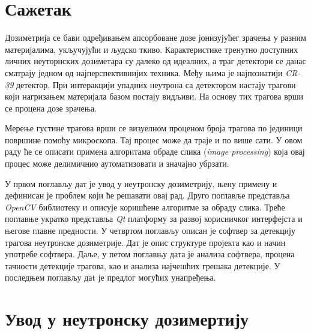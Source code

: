 \documentclass[12pt,a4paper,serbian,oneside]{book}
\begin{document}


%
%
%

\tableofcontents
\newpage

%
%
%

\chapter*{Сажетак}

Дозиметрија се бави одређивањем апсорбоване дозе јонизујућег зрачења у разним материјалима, укључујући и људско ткиво. Карактеристике тренутно доступних личних неуторнских дозиметара су далеко од идеалних, а траг детектори се данас сматрају једном од најперспективнијих техника. Међу њима је најпознатији \textit{CR-39} детектор. При интеракцији упадних неутрона са детектором настају трагови који нагризањем материјала базом постају видљиви. На основу тих трагова врши се процена дозе зрачења. 

Мерење густине трагова врши се визуелном проценом броја трагова по јединици површине помоћу микроскопа. Тај процес може да траје и по више сати. У овом раду ће се описати примена алгоритама обраде слика (\textit{image processing}) која овај процес може делимичнио аутоматизовати и значајно убрзати.

У првом поглављу дат је увод у неутронску дозиметрију, њену примену и дефинисан је проблем који ће решавати овај рад. Друго поглавље представља \textit{OpenCV} библиотеку и описује коришћене алгоритме за обраду слика. Треће поглавње укратко представља \textit{Qt} платформу за развој корисничког интерфејста и његове главне предности. У четвртом поглављу описан је софтвер за детекцију трагова неутронске дозиметрије. Дат је опис структуре пројекта као и начин употребе софтвера. Даље, у петом поглавњу дата је анализа софтвера, процена тачности детекције трагова, као и анализа најчешћих грешака детекције. У последњем поглављу даt је предлог могућих унапређења.

%
%
%

\chapter{Увод у неутронску дозимертију}
\end{document}
